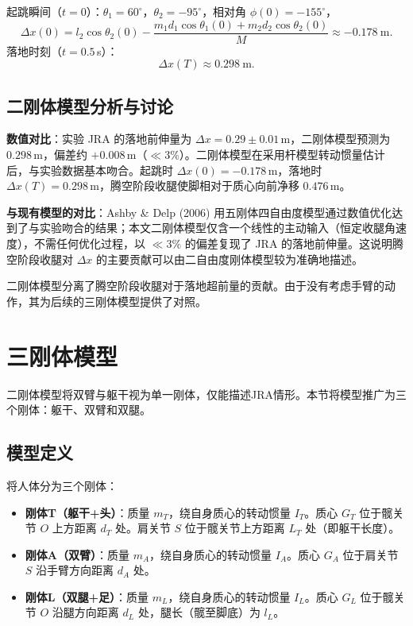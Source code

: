 \documentclass{article}
\begin{document}
起跳瞬间（$t=0$）：$\theta_1=60^\circ$，$\theta_2=-95^\circ$，相对角 $\phi(0)=-155^\circ$，
\begin{equation}
\Delta x(0)=l_2\cos\theta_2(0)-\frac{m_1 d_1\cos\theta_1(0)+m_2 d_2\cos\theta_2(0)}{M}\approx -0.178\ \text{m}.
\end{equation}
落地时刻（$t=0.5$\,s）：
\begin{equation}
\boxed{\Delta x(T) \approx 0.298\ \text{m}}.
\end{equation}

\subsection{二刚体模型分析与讨论}

\textbf{数值对比}：实验 JRA 的落地前伸量为 $\Delta x=0.29\pm0.01$\,m，二刚体模型预测为 $0.298$\,m，偏差约 $+0.008$\,m（$\ll 3\%$）。二刚体模型在采用杆模型转动惯量估计后，与实验数据基本吻合。起跳时 $\Delta x(0) = -0.178$\,m，落地时 $\Delta x(T) = 0.298$\,m，腾空阶段收腿使脚相对于质心向前净移 $0.476$\,m。

\textbf{与现有模型的对比}：Ashby \& Delp (2006) 用五刚体四自由度模型通过数值优化达到了与实验吻合的结果；本文二刚体模型仅含一个线性的主动输入（恒定收腿角速度），不需任何优化过程，以 $\ll 3\%$ 的偏差复现了 JRA 的落地前伸量。这说明腾空阶段收腿对 $\Delta x$ 的主要贡献可以由二自由度刚体模型较为准确地描述。

二刚体模型分离了腾空阶段收腿对于落地超前量的贡献。由于没有考虑手臂的动作，其为后续的三刚体模型提供了对照。

\section{三刚体模型}
\label{sec:three_body}

二刚体模型将双臂与躯干视为单一刚体，仅能描述JRA情形。本节将模型推广为三个刚体：躯干、双臂和双腿。

\subsection{模型定义}

将人体分为三个刚体：
\begin{itemize}
\item \textbf{刚体T（躯干+头）}：质量 $m_T$，绕自身质心的转动惯量 $I_T$。质心 $G_T$ 位于髋关节 $O$ 上方距离 $d_T$ 处。肩关节 $S$ 位于髋关节上方距离 $L_T$ 处（即躯干长度）。
\item \textbf{刚体A（双臂）}：质量 $m_A$，绕自身质心的转动惯量 $I_A$。质心 $G_A$ 位于肩关节 $S$ 沿手臂方向距离 $d_A$ 处。
\item \textbf{刚体L（双腿+足）}：质量 $m_L$，绕自身质心的转动惯量 $I_L$。质心 $G_L$ 位于髋关节 $O$ 沿腿方向距离 $d_L$ 处，腿长（髋至脚底）为 $l_L$。
\end{itemize}
\end{document}
